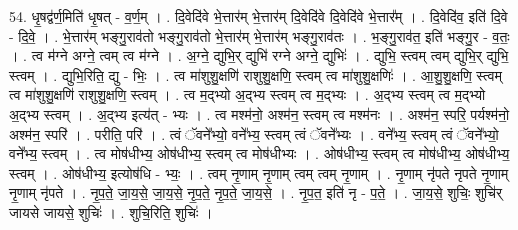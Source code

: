 \documentclass[17pt]{extarticle}
\begin{document}
54. धृ॒षद्व॑र्ण॒मिति॑ धृ॒षत् - व॒र्ण॒म् । . दि॒वेदि॑वे भे॒त्तार॑म् भे॒त्तार॑म् दि॒वेदि॑वे दि॒वेदि॑वे भे॒त्तार᳚म् । . दि॒वेदि॑व॒ इति॑ दि॒वे - दि॒वे॒ । . भे॒त्तार॑म् भङ्गु॒राव॑तो भङ्गु॒राव॑तो भे॒त्तार॑म् भे॒त्तार॑म् भङ्गु॒राव॑तः । . भ॒ङ्गु॒राव॑त॒ इति॑ भङ्गु॒र - व॒तः॒ । . त्व म॑ग्ने अग्ने॒ त्वम् त्व म॑ग्ने । . अ॒ग्ने॒ द्युभि॒र् द्युभि॑ रग्ने अग्ने॒ द्युभिः॑ । . द्युभि॒ स्त्वम् त्वम् द्युभि॒र् द्युभि॒ स्त्वम् । . द्युभि॒रिति॒ द्यु - भिः॒ । . त्व मा॑शुशु॒क्षणि॑ राशुशु॒क्षणि॒ स्त्वम् त्व मा॑शुशु॒क्षणिः॑ । . आ॒शु॒शु॒क्षणि॒ स्त्वम् त्व मा॑शुशु॒क्षणि॑ राशुशु॒क्षणि॒ स्त्वम् । . त्व म॒द्भ्यो अ॒द्भ्य स्त्वम् त्व म॒द्भ्यः । . अ॒द्भ्य स्त्वम् त्व म॒द्भ्यो अ॒द्भ्य स्त्वम् । . अ॒द्भ्य इत्य॑त् - भ्यः । . त्व मश्म॑नो॒ अश्म॑न॒ स्त्वम् त्व मश्म॑नः । . अश्म॑न॒ स्परि॒ पर्यश्म॑नो॒ अश्म॑न॒ स्परि॑ । . परीति॒ परि॑ । . त्वं ॅवने᳚भ्यो॒ वने᳚भ्य॒ स्त्वम् त्वं ॅवने᳚भ्यः । . वने᳚भ्य॒ स्त्वम् त्वं ॅवने᳚भ्यो॒ वने᳚भ्य॒ स्त्वम् । . त्व मोष॑धीभ्य॒ ओष॑धीभ्य॒ स्त्वम् त्व मोष॑धीभ्यः । . ओष॑धीभ्य॒ स्त्वम् त्व मोष॑धीभ्य॒ ओष॑धीभ्य॒ स्त्वम् । . ओष॑धीभ्य॒ इत्योष॑धि - भ्यः॒ । . त्वम् नृ॒णाम् नृ॒णाम् त्वम् त्वम् नृ॒णाम् । . नृ॒णाम् नृ॑पते नृपते नृ॒णाम् नृ॒णाम् नृ॑पते । . नृ॒प॒ते॒ जा॒य॒से॒ जा॒य॒से॒ नृ॒प॒ते॒ नृ॒प॒ते॒ जा॒य॒से॒ । . नृ॒प॒त॒ इति॑ नृ - प॒ते॒ । . जा॒य॒से॒ शुचिः॒ शुचि॑र् जायसे जायसे॒ शुचिः॑ । . शुचि॒रिति॒ शुचिः॑ । \newline
\end{document}
